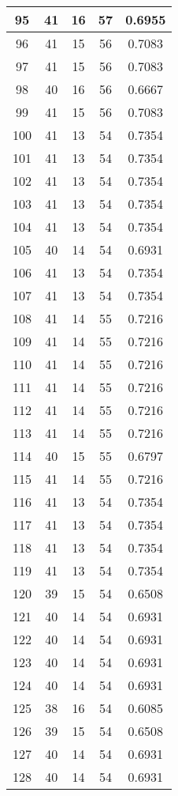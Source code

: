 \documentclass[letterpaper, 12pt]{article}
\begin{document}
\begin{longtable}{|c|c|c|c|c|}
\hline
95 & 41 & 16 & 57 & 0.6955 \\
\hline
96 & 41 & 15 & 56 & 0.7083 \\
\hline
97 & 41 & 15 & 56 & 0.7083 \\
\hline
98 & 40 & 16 & 56 & 0.6667 \\
\hline
99 & 41 & 15 & 56 & 0.7083 \\
\hline
100 & 41 & 13 & 54 & 0.7354 \\
\hline
101 & 41 & 13 & 54 & 0.7354 \\
\hline
102 & 41 & 13 & 54 & 0.7354 \\
\hline
103 & 41 & 13 & 54 & 0.7354 \\
\hline
104 & 41 & 13 & 54 & 0.7354 \\
\hline
105 & 40 & 14 & 54 & 0.6931 \\
\hline
106 & 41 & 13 & 54 & 0.7354 \\
\hline
107 & 41 & 13 & 54 & 0.7354 \\
\hline
108 & 41 & 14 & 55 & 0.7216 \\
\hline
109 & 41 & 14 & 55 & 0.7216 \\
\hline
110 & 41 & 14 & 55 & 0.7216 \\
\hline
111 & 41 & 14 & 55 & 0.7216 \\
\hline
112 & 41 & 14 & 55 & 0.7216 \\
\hline
113 & 41 & 14 & 55 & 0.7216 \\
\hline
114 & 40 & 15 & 55 & 0.6797 \\
\hline
115 & 41 & 14 & 55 & 0.7216 \\
\hline
116 & 41 & 13 & 54 & 0.7354 \\
\hline
117 & 41 & 13 & 54 & 0.7354 \\
\hline
118 & 41 & 13 & 54 & 0.7354 \\
\hline
119 & 41 & 13 & 54 & 0.7354 \\
\hline
120 & 39 & 15 & 54 & 0.6508 \\
\hline
121 & 40 & 14 & 54 & 0.6931 \\
\hline
122 & 40 & 14 & 54 & 0.6931 \\
\hline
123 & 40 & 14 & 54 & 0.6931 \\
\hline
124 & 40 & 14 & 54 & 0.6931 \\
\hline
125 & 38 & 16 & 54 & 0.6085 \\
\hline
126 & 39 & 15 & 54 & 0.6508 \\
\hline
127 & 40 & 14 & 54 & 0.6931 \\
\hline
128 & 40 & 14 & 54 & 0.6931 \\

\end{longtable}
\end{document}

